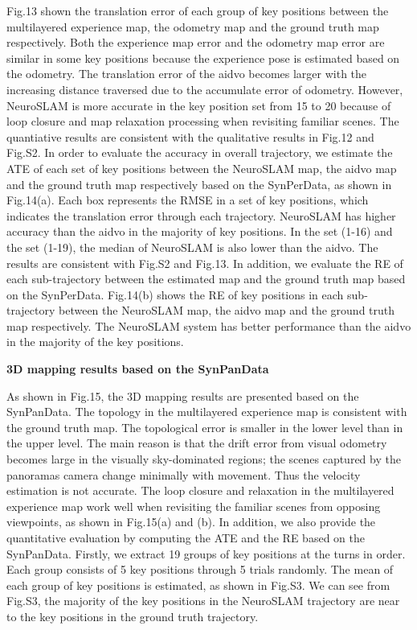 Fig.13 shown the translation error of each group of key positions between the multilayered experience map, the odometry map and the ground truth map respectively.
Both the experience map error and the odometry map error are similar in some key positions because the experience pose is estimated based on the odometry.
The translation error of the aidvo becomes larger with the increasing distance traversed due to the accumulate error of odometry.
However, NeuroSLAM is more accurate in the key position set from 15 to 20 because of loop closure and map relaxation processing when revisiting familiar scenes.
The quantiative results are consistent with the qualitative results in Fig.12 and Fig.S2.
In order to evaluate the accuracy in overall trajectory, we estimate the ATE of each set of key positions between the NeuroSLAM map, the aidvo map and the ground truth map respectively based on the SynPerData, as shown in Fig.14(a).
Each box represents the RMSE in a set of key positions, which indicates the translation error through each trajectory.
NeuroSLAM has higher accuracy than the aidvo in the majority of key positions.
In the set (1-16) and the set (1-19), the median of NeuroSLAM is also lower than the aidvo.
The results are consistent with Fig.S2 and Fig.13.
In addition, we evaluate the RE of each sub-trajectory between the estimated map and the ground truth map based on the SynPerData.
Fig.14(b) shows the RE of key positions in each sub-trajectory between the NeuroSLAM map, the aidvo map and the ground truth map respectively.
The NeuroSLAM system has better performance than the aidvo in the majority of the key positions.



\noindent \textbf{3D mapping results based on the SynPanData}

As shown in Fig.15, the 3D mapping results are presented based on the SynPanData.
The topology in the multilayered experience map is consistent with the ground truth map.
The topological error is smaller in the lower level than in the upper level.
The main reason is that the drift error from visual odometry becomes large in the visually sky-dominated regions;
the scenes captured by the panoramas camera change minimally with movement.
Thus the velocity estimation is not accurate.
The loop closure and relaxation in the multilayered experience map work well when revisiting the familiar scenes from opposing viewpoints, as shown in Fig.15(a) and (b).
In addition, we also provide the quantitative evaluation by computing the ATE and the RE based on the SynPanData.
Firstly, we extract 19 groups of key positions at the turns in order.
Each group consists of 5 key positions through 5 trials randomly.
The mean of each group of key positions is estimated, as shown in Fig.S3.
We can see from Fig.S3, the majority of the key positions in the NeuroSLAM trajectory are near to the key positions in the ground truth trajectory.


